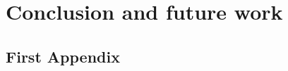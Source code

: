 \documentclass[letterpaper,12pt,onecolumn,final]{report}
\begin{document}
\chapter{Conclusion and future work}
\label{chap:conclusion}

\blindtext[5]



\clearpage
{}
{}  %
\singlespacing %





\appendix
\setcounter{table}{0}		%
\setcounter{figure}{0}		%
\renewcommand{\thefigure}{\Alph{chapter}.\arabic{figure}} 	%
\renewcommand{\thetable}{\Alph{chapter}.\arabic{table}}		%

\begin{appendices}
\doublespacing

\chapter{First Appendix}
\label{chap:apdx1}

\blindmathpaper


\end{appendices}
\end{document}
